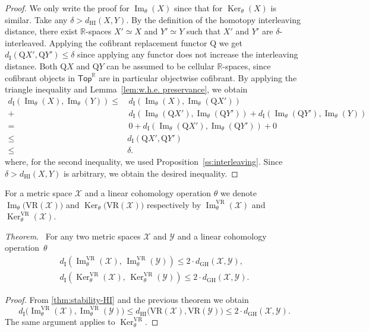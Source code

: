 \documentclass{amsart}
\makeatletter
\renewcommand\subsubsection{\@startsection{subsubsection}{3}
	\z@{.5\linespacing\@plus.7\linespacing}{0em}
	{\normalfont\itshape}}
\theoremstyle{definition}
\newcommand{\R}{\mathbb{R}}
\newcommand{\Top}{\mathsf{Top}}
\newcommand{\rI}{\mathrm{I}}
\newcommand{\rQ}{\mathrm{Q}}
\newcommand{\cX}{\mathcal{X}}
\newcommand{\cY}{\mathcal{Y}}
\newcommand{\darkblue}{\color{darkblue}}
\newcommand{\VR}{\mathrm{VR}}
\renewcommand{\theorem}{\medskip\noindent\textit{\darkblue Theorem}.\ }
\theoremstyle{theorem}
\DeclareMathOperator{\img}{Im}
\renewcommand{\ker}{\operatorname{Ker}}
\newcommand{\dgh}{d_{\mathrm{GH}}}
\newcommand{\dhi}{d_{\mathrm{HI}}}
\newcommand{\di}{d_{\mathrm{I}}}
\makeatother
\begin{document}
\begin{proof}
	We only write the proof for $\img_\theta(X)$ since that for $\ker_\theta(X)$ is similar.
	Take any $\delta > \dhi(X,Y)$.
	By the definition of the homotopy interleaving distance, there exist $\R$-spaces $X' \simeq X$ and $Y' \simeq Y$ such that $X'$ and $Y'$ are $\delta$-interleaved.
	Applying the cofibrant replacement functor $\rQ$ we get $d_\rI(\rQ X', \rQ Y') \leq \delta$ since applying any functor does not increase the interleaving distance.
	Both $\rQ X$ and $\rQ Y$ can be assumed to be cellular $\R$-spaces, since cofibrant objects in $\Top^\R$ are in particular objectwise cofibrant.
	By applying the triangle inequality and Lemma~\ref{lem:w.h.e. preservance}, we obtain
	\begin{align*}
		\di(\img_\theta(X), \img_\theta(Y)) \leq& \,
		\di(\img_\theta(X), \img_\theta(\rQ X')) \\ +& \,
		\di(\img_\theta(\rQ X'), \img_\theta(\rQ Y')) + \di(\img_\theta(\rQ Y'), \img_\theta(Y)) \\ =& \,
		0 + \di(\img_\theta(\rQ X'), \img_\theta(\rQ Y')) + 0 \\ \leq \,&
		\di(\rQ X', \rQ Y') \\ \leq \,&
		\delta.
	\end{align*}
	where, for the second inequality, we used Proposition~\ref{ss:interleaving}.
	Since $\delta > \dhi(X,Y)$ is arbitrary, we obtain the desired inequality.
\end{proof}

\subsubsection{}\label{thm:stability VR}

For a metric space \(\cX\) and a linear cohomology operation \(\theta\) we denote \(\img_\theta\big(\VR(\cX)\big)\) and \(\ker_\theta\big(\VR(\cX)\big)\) respectively by \(\img_\theta^\VR(\cX)\) and \(\ker_\theta^\VR(\cX)\).

\theorem
For any two metric spaces $\cX$ and $\cY$ and a linear cohomology operation~$\theta$
\begin{align*}
	\di(\img_\theta^\VR(\cX),\, \img_\theta^\VR(\cY)) \leq 2 \cdot \dgh(\cX,\cY), \\
	\di(\ker_\theta^\VR(\cX),\, \ker_\theta^\VR(\cY)) \leq 2 \cdot \dgh(\cX,\cY).
\end{align*}

\begin{proof}
	From \cref{thm:stability-HI} and the previous theorem we obtain
	\[
	\di\big(\img_\theta^\VR(\cX), \img_\theta^\VR(\cY)\big) \leq
	\dhi\big(\VR(\cX), \VR(\cY)\big) \leq 2 \cdot \dgh(\cX,\cY).
	\]
	The same argument applies to $\ker_\theta^\VR$.
\end{proof}
\end{document}
